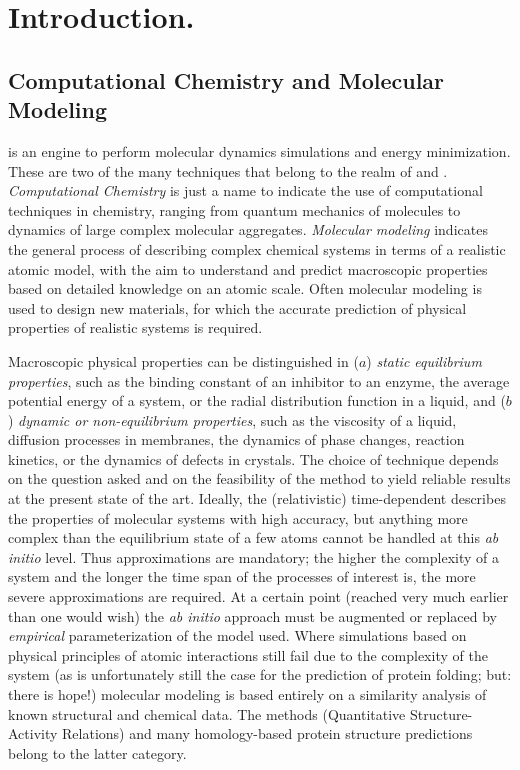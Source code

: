 \chapter{Introduction.}

\section{Computational Chemistry and Molecular Modeling}

\label{sec:Compchem}

{\gromacs} is an engine to perform molecular dynamics simulations and 
energy minimization. These are two of the many techniques that belong 
to the realm of  and 
. 
{\em Computational Chemistry} is just a name to indicate the use of 
computational techniques in chemistry, ranging from quantum mechanics 
of molecules to dynamics of large complex molecular aggregates. {\em 
Molecular modeling} indicates the general process of describing 
complex chemical systems in terms of a realistic atomic model, with the 
aim to understand and predict macroscopic properties based on detailed 
knowledge on an atomic scale. Often molecular modeling is used to 
design new materials, for which the accurate prediction of physical 
properties of realistic systems is required. 

Macroscopic physical properties can be distinguished in ($a$) {\em static 
equilibrium properties}, such as the binding constant  of an inhibitor to an 
enzyme, the average potential energy of a system, or the radial distribution  
function in a liquid, and ($b$) {\em
dynamic or non-equilibrium properties}, such as the viscosity of a 
liquid, diffusion processes in membranes, the dynamics of phase 
changes, reaction kinetics, or the dynamics of defects in crystals.  
The choice of technique depends on the question asked and on the 
feasibility of the method to yield reliable results at the present 
state of the art. Ideally, the (relativistic) time-dependent 
describes the properties of molecular systems 
with high accuracy, but anything more complex than the equilibrium 
state of a few atoms cannot be handled at this {\em ab initio} level. 
Thus approximations are mandatory; the higher the complexity of a 
system and the longer the time span of the processes of interest is, 
the more severe approximations are required. At a certain point 
(reached very much earlier than one would wish) the {\em ab initio} 
approach must be augmented or replaced by {\em empirical} 
parameterization of the model used. Where simulations based on physical 
principles of atomic interactions still fail  due to the complexity of the 
system (as is unfortunately 
still the case for the prediction of protein folding; but: there is hope!) 
molecular modeling is based entirely on a similarity analysis of known 
structural and chemical data. The  methods (Quantitative 
Structure-Activity Relations) and many homology-based protein structure  
predictions belong to the latter category.


